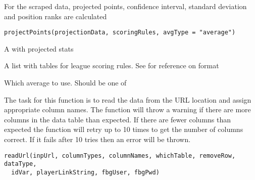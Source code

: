 \documentclass[a4paper]{book}
\begin{document}
%
\begin{Description}\relax
For the scraped data, projected points, confidence interval, standard deviation
and position ranks are calculated
\end{Description}
%
\begin{Usage}
\begin{verbatim}
projectPoints(projectionData, scoringRules, avgType = "average")
\end{verbatim}
\end{Usage}
%
\begin{Arguments}
\begin{ldescription}
\item[\code{projectionData}] A  with projected stats

\item[\code{scoringRules}] A list with tables for league scoring rules. See
 for reference on format

\item[\code{avgType}] Which average to use. Should be one of 
\end{ldescription}
\end{Arguments}
%
\begin{Description}\relax
The task for this function is to read the data from the URL location and assign
appropriate column names. The function will throw a warning if there are
more columns in the data table than expected. If there are fewer columns than
expected the function will retry up to 10 times to get the number of columns
correct. If it fails after 10 tries then an error will be thrown.
\end{Description}
%
\begin{Usage}
\begin{verbatim}
readUrl(inpUrl, columnTypes, columnNames, whichTable, removeRow, dataType,
  idVar, playerLinkString, fbgUser, fbgPwd)
\end{verbatim}
\end{Usage}
%
\end{document}
